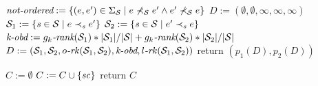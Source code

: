 \begin{function}[!t]
\SetNoFillComment
$\emph{not-ordered} := \{(e,e')\in\Sigma_\mathcal{S}\;|\;e\not\prec_{\mathcal{S}}e'\wedge
e'\not\prec_{\mathcal{S}}e\}$\;
$D := (\emptyset,\emptyset,\infty,\infty,\infty)$
{
$\mathcal{S}_1:= \{\mathit{s}\in \mathcal{S}\;|\;e\prec_{\mathit{s}}e'\}$\;
  $\mathcal{S}_2:= \{\mathit{s}\in \mathcal{S}\;|\;e'\prec_{\mathit{s}}e\}$\;%
    $\emph{k-obd} :=
            {g_{k}}\emph{-rank}(\mathcal{S}_1)*|\mathcal{S}_1|/|\mathcal{S}|+{g_{k}}\emph{-rank}(\mathcal{S}_2)*|\mathcal{S}_2|/|\mathcal{S}|$\;
   {
       $D := (\mathcal{S}_1,\mathcal{S}_2,o\emph{-}\mathit{rk}(\mathcal{S}_1,\mathcal{S}_2),\emph{k-obd}, l\emph{-}\mathit{rk}(\mathcal{S}_1,\mathcal{S}_2))$\;
   }
}
     return $(p_1(D), p_2(D))$\;
\caption{partition-order(a set of scenarios $\mathcal{S}$)}
\label{algo-partition-order}
\end{function}
\begin{function}[!t]
\SetNoFillComment
$C:=\emptyset$
        {
             {
              $C:=C\cup\{\mathit{sc}\}$\;
               }
          }
return $C$\;
	\caption{compatible(a set of scenarios $\mathcal{S}$)}
	\label{compatible}
\end{function}
